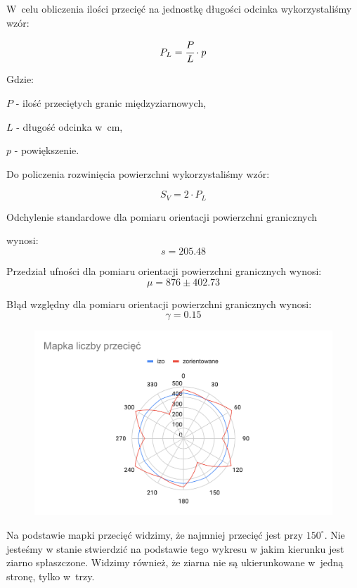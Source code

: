 \documentclass[a4paper,12pt]{article}
\begin{document}
W~celu obliczenia ilości przecięć na jednostkę długości odcinka wykorzystaliśmy wzór:

$$P_L=\cfrac{P}{L} \cdot p$$

Gdzie:

$P$ - ilość przeciętych granic międzyziarnowych,

$L$ - długość odcinka w~cm,

$p$ - powiększenie.
\newline

Do policzenia rozwinięcia powierzchni wykorzystaliśmy wzór:

$$S_V= 2\cdot P_L$$



Odchylenie standardowe dla pomiaru orientacji powierzchni granicznych 

wynosi:
$$s=205.48$$

Przedział ufności dla pomiaru orientacji powierzchni granicznych wynosi:
$$\mu = 876\pm 402.73$$

Błąd względny dla pomiaru orientacji powierzchni granicznych wynosi:
$$\gamma = 0.15$$
\newline

\begin{figure}[H]
    \centering
    \includegraphics[width=\textwidth]{img/Mapka liczby przecięć.pdf}
\end{figure}

{\color{purple}
Na podstawie mapki przecięć widzimy, że najmniej przecięć jest przy $150^{\circ}$. Nie jesteśmy w stanie stwierdzić na podstawie tego wykresu w jakim kierunku jest ziarno spłaszczone. Widzimy również, że ziarna nie są ukierunkowane w~jedną stronę, tylko w~trzy. 
}
\end{document}
